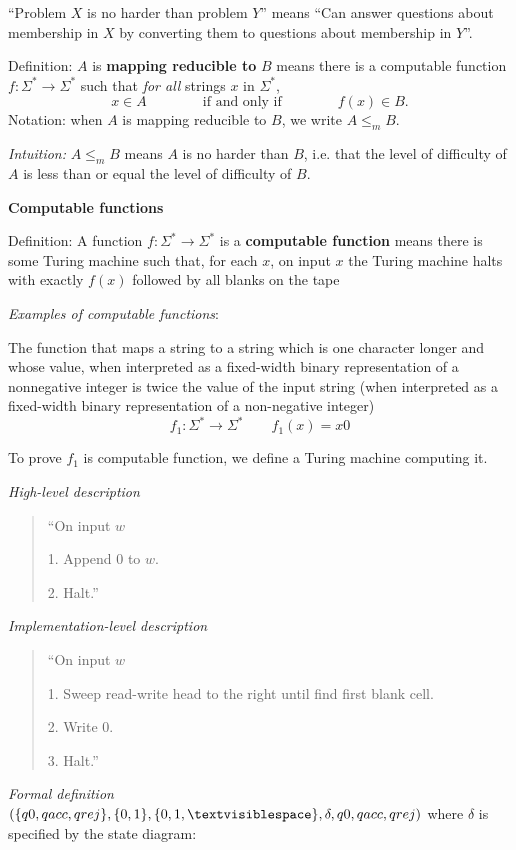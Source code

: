 \documentclass[12pt, oneside]{article}
\begin{document}
``Problem $X$ is no harder than problem $Y$'' means 
``Can answer questions about membership in $X$ by converting them to questions about membership in $Y$''.



Definition:  $A$ is  {\bf  mapping  reducible to} $B$  means there is a computable function 
$f : \Sigma^* \to \Sigma^*$ such that {\it for all} strings  $x$ in $\Sigma^*$, 
\[
x  \in  A \qquad \qquad \text{if and  only  if} \qquad \qquad f(x) \in B.
\]
Notation:  when $A$  is mapping reducible to $B$, we write $A  \leq_m B$.

{\it Intuition:} $A \leq_m B$ means $A$ is no harder than $B$, i.e. that the level 
of difficulty of $A$ is less than or equal the level of difficulty of $B$.

\vfill

\newpage
{\bf Computable functions}

Definition: A function $f: \Sigma^* \to \Sigma^*$ is a {\bf computable function} means there is some Turing machine such that, 
for each $x$, on input $x$ the Turing machine halts with exactly $f(x)$ followed by all blanks on the tape

{\it Examples of computable functions}:

The function that maps a string to a string which is one character longer and 
whose value, when interpreted as a fixed-width binary representation of a
nonnegative integer is twice the value of the input string (when interpreted as 
a fixed-width binary representation of a non-negative integer)
\[
f_1: \Sigma^* \to \Sigma^* \qquad  f_1(x)  = x0
\]

To prove $f_1$ is computable function, we define a Turing machine computing it.

{\it High-level description}
\begin{quote}
    ``On input $w$
    
    1. Append $0$ to $w$.
    
    2. Halt.''
\end{quote}

{\it Implementation-level description}
\begin{quote}
    ``On input $w$
    
    1. Sweep read-write head to the right until find first blank cell.
    
    2. Write 0.
    
    3. Halt.''
\end{quote}

{\it Formal definition} $(\{q0, qacc, qrej\}, \{0,1\}, \{0,1,\textvisiblespace\},\delta, q0, qacc, qrej)$
where $\delta$ is specified by the state diagram: 
\end{document}
